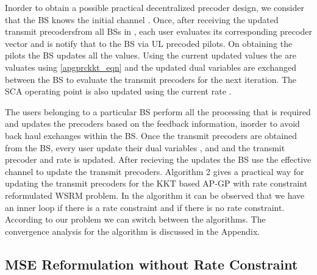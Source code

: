 Inorder to obtain a possible practical decentralized precoder design, we consider that the \ac{BS}  knows the initial channel . Once, after receiving the updated transmit precodersfrom all \ac{BS}s in , each user evaluates its corresponding precoder vector and is notify that to the \ac{BS} via \ac{UL} precoded pilots. On obtaining the pilots the \ac{BS} updates all the values. Using the current updated values the  are valuates using \eqref{apgprckkt_eqn} and the updated dual variables are exchanged between the \ac{BS} to evaluate the transmit precoders for the next iteration. The \ac{SCA} operating point is also updated using the current rate . 

The users belonging to a particular \ac{BS} perform all the processing that is required and updates the precoders based on the feedback information, inorder to avoid back haul exchanges within the \ac{BS}. Once the transmit precoders are obtained from the \ac{BS}, every user update their dual variables ,  and  and the transmit precoder  and rate  is updated. After recieving the updates the \ac{BS} use the effective channel to update the transmit precoders. Algorithm 2 gives a practical way for updating the transmit precoders for the \ac{KKT} based AP-GP with rate constraint reformulated \ac{WSRM} problem. In the algorithm it can be observed that we have an inner loop if there is a rate constraint and if there is no rate constraint. According to our problem we can switch between the algorithms. The convergence analysis for the algorithm is discussed in the Appendix.


\subsection{MSE Reformulation without Rate Constraint}

